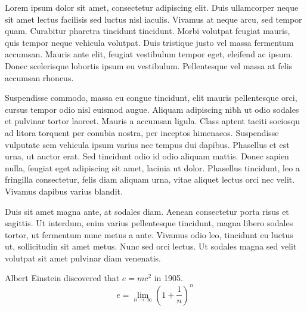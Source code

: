 \documentclass[11pt,arial]{moderncv}        %
\begin{document}
Lorem ipsum dolor sit amet, consectetur adipiscing elit. Duis ullamcorper neque sit amet lectus facilisis sed luctus nisl iaculis. Vivamus at neque arcu, sed tempor quam. Curabitur pharetra tincidunt tincidunt. Morbi volutpat feugiat mauris, quis tempor neque vehicula volutpat. Duis tristique justo vel massa fermentum accumsan. Mauris ante elit, feugiat vestibulum tempor eget, eleifend ac ipsum. Donec scelerisque lobortis ipsum eu vestibulum. Pellentesque vel massa at felis accumsan rhoncus.

Suspendisse commodo, massa eu congue tincidunt, elit mauris pellentesque orci, cursus tempor odio nisl euismod augue. Aliquam adipiscing nibh ut odio sodales et pulvinar tortor laoreet. Mauris a accumsan ligula. Class aptent taciti sociosqu ad litora torquent per conubia nostra, per inceptos himenaeos. Suspendisse vulputate sem vehicula ipsum varius nec tempus dui dapibus. Phasellus et est urna, ut auctor erat. Sed tincidunt odio id odio aliquam mattis. Donec sapien nulla, feugiat eget adipiscing sit amet, lacinia ut dolor. Phasellus tincidunt, leo a fringilla consectetur, felis diam aliquam urna, vitae aliquet lectus orci nec velit. Vivamus dapibus varius blandit.

Duis sit amet magna ante, at sodales diam. Aenean consectetur porta risus et sagittis. Ut interdum, enim varius pellentesque tincidunt, magna libero sodales tortor, ut fermentum nunc metus a ante. Vivamus odio leo, tincidunt eu luctus ut, sollicitudin sit amet metus. Nunc sed orci lectus. Ut sodales magna sed velit volutpat sit amet pulvinar diam venenatis.

Albert Einstein discovered that $e=mc^2$ in 1905.
$$ e=\lim_{n \to \infty} \left(1+\frac{1}{n}\right)^n $$

\makeletterclosing
\end{document}

